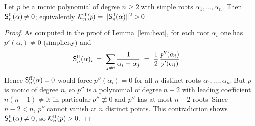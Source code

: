 \begin{qfourlemma}\label{lem:positive}
Let $p$ be a monic polynomial of degree $n\ge2$ with simple roots
$\alpha_1,\dots,\alpha_n$. Then $\mathsf{S}^{\mathrm{ff}}_n(\alpha)\ne0$; equivalently
$\mathcal{K}^{\mathrm{ff}}_n(p)=\|\mathsf{S}^{\mathrm{ff}}_n(\alpha)\|^2>0$.
\end{qfourlemma}

\begin{proof}
As computed in the proof of Lemma~\ref{lem:heat}, for each root $\alpha_i$ one has
$p'(\alpha_i)\ne0$ (simplicity) and
\[
\mathsf{S}^{\mathrm{ff}}_n(\alpha)_i\;=\;\sum_{j\ne i}\frac{1}{\alpha_i-\alpha_j}
\;=\;\frac{1}{2}\,\frac{p''(\alpha_i)}{p'(\alpha_i)} .
\]
Hence $\mathsf{S}^{\mathrm{ff}}_n(\alpha)=0$ would force $p''(\alpha_i)=0$ for all $n$ distinct
roots $\alpha_1,\dots,\alpha_n$. But $p$ is monic of degree $n$, so $p''$ is a
polynomial of degree $n-2$ with leading coefficient $n(n-1)\ne0$; in particular
$p''\not\equiv0$ and $p''$ has at most $n-2$ roots. Since $n-2<n$, $p''$ cannot
vanish at $n$ distinct points. This contradiction shows $\mathsf{S}^{\mathrm{ff}}_n(\alpha)\ne0$,
so $\mathcal{K}^{\mathrm{ff}}_n(p)>0$.
\end{proof}

